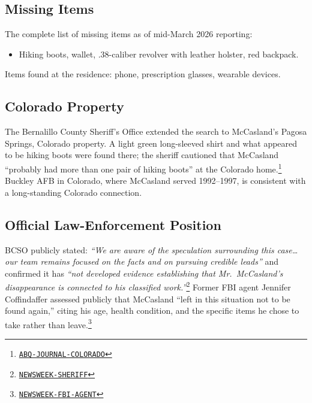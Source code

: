 \documentclass[11pt]{article}
\newcommand{\src}[2]{\href{#1}{\texttt{#2}}}
\begin{document}
\subsection{Missing Items}

The complete list of missing items as of mid-March 2026 reporting:

\begin{itemize}
  \item Hiking boots, wallet, .38-caliber revolver with leather holster, red backpack.
\end{itemize}

Items found at the residence: phone, prescription glasses, wearable devices.

\subsection{Colorado Property}

The Bernalillo County Sheriff's Office extended the search to McCasland's Pagosa Springs, Colorado property. A light green long-sleeved shirt and what appeared to be hiking boots were found there; the sheriff cautioned that McCasland ``probably had more than one pair of hiking boots'' at the Colorado home.\footnote{\src{https://www.abqjournal.com/news/former-air-force-commander-remains-missing-search-extended-to-his-colorado-home/3002400}{ABQ-JOURNAL-COLORADO}} Buckley AFB in Colorado, where McCasland served 1992--1997, is consistent with a long-standing Colorado connection.

\subsection{Official Law-Enforcement Position}

BCSO publicly stated: \emph{``We are aware of the speculation surrounding this case\ldots our team remains focused on the facts and on pursuing credible leads''} and confirmed it has \emph{``not developed evidence establishing that Mr.\ McCasland's disappearance is connected to his classified work.''}\footnote{\src{https://www.newsweek.com/neil-mccasland-update-sheriff-addresses-speculation-missing-general-11827036}{NEWSWEEK-SHERIFF}} Former FBI agent Jennifer Coffindaffer assessed publicly that McCasland ``left in this situation not to be found again,'' citing his age, health condition, and the specific items he chose to take rather than leave.\footnote{\src{https://www.newsweek.com/mccasland-update-ex-fbi-agent-theory-missing-expert-11812428}{NEWSWEEK-FBI-AGENT}}
\end{document}
